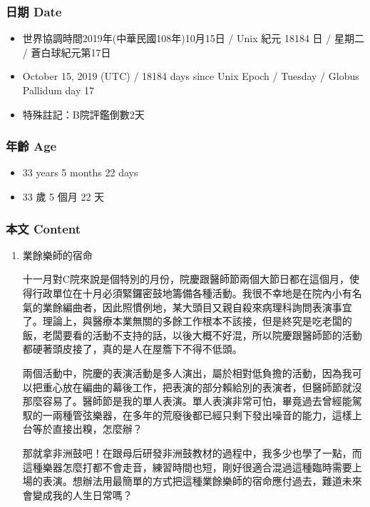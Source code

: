\documentclass[
]{article}
\providecommand{\tightlist}{%
  \setlength{\itemsep}{0pt}\setlength{\parskip}{0pt}}
\begin{document}
\hypertarget{ux65e5ux671f-date-14}{%
\subsubsection{日期 Date}\label{ux65e5ux671f-date-14}}

\begin{itemize}
\tightlist
\item
  世界協調時間2019年(中華民國108年)10月15日 / Unix 紀元 18184 日 /
  星期二 / 蒼白球紀元第17日
\item
  October 15, 2019 (UTC) / 18184 days since Unix Epoch / Tuesday /
  Globus Pallidum day 17
\item
  特殊註記：B院評鑑倒數2天
\end{itemize}

\hypertarget{ux5e74ux9f61-age-14}{%
\subsubsection{年齡 Age}\label{ux5e74ux9f61-age-14}}

\begin{itemize}
\tightlist
\item
  33 years 5 months 22 days
\item
  33 歲 5 個月 22 天
\end{itemize}

\hypertarget{ux672cux6587-content-14}{%
\subsubsection{本文 Content}\label{ux672cux6587-content-14}}

\begin{enumerate}
\def\labelenumi{\arabic{enumi}.}
\item
  業餘樂師的宿命

  十一月對C院來說是個特別的月份，院慶跟醫師節兩個大節日都在這個月，使得行政單位在十月必須緊鑼密鼓地籌備各種活動。我很不幸地是在院內小有名氣的業餘編曲者，因此照慣例地，某大頭目又親自殺來病理科詢問表演事宜了。理論上，與醫療本業無關的多餘工作根本不該接，但是終究是吃老闆的飯，老闆要看的活動不支持的話，以後大概不好混，所以院慶跟醫師節的活動都硬著頭皮接了，真的是人在屋簷下不得不低頭。

  兩個活動中，院慶的表演活動是多人演出，屬於相對低負擔的活動，因為我可以把重心放在編曲的幕後工作，把表演的部分賴給別的表演者，但醫師節就沒那麼容易了。醫師節是我的單人表演。單人表演非常可怕，畢竟過去曾經能駕馭的一兩種管弦樂器，在多年的荒廢後都已經只剩下發出噪音的能力，這樣上台等於直接出糗，怎麼辦？

  那就拿非洲鼓吧！在跟母后研發非洲鼓教材的過程中，我多少也學了一點，而這種樂器怎麼打都不會走音，練習時間也短，剛好很適合混過這種臨時需要上場的表演。想辦法用最簡單的方式把這種業餘樂師的宿命應付過去，難道未來會變成我的人生日常嗎？
\end{enumerate}
\end{document}
